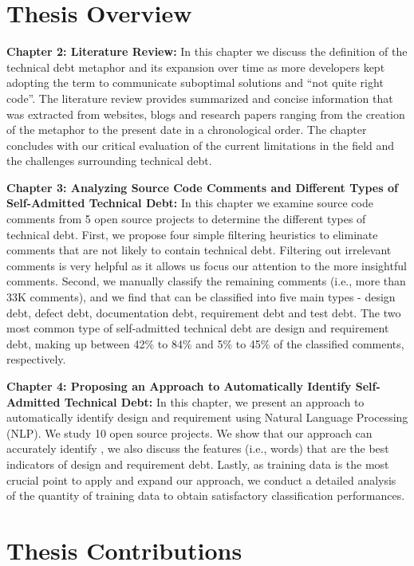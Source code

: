 \section{Thesis Overview}


\noindent\textbf{Chapter 2: Literature Review:} In this chapter we discuss the definition of the technical debt metaphor and its expansion over time as more developers kept adopting the term to communicate suboptimal solutions and ``not quite right code''. The literature review provides summarized and concise information that was extracted from websites, blogs and research papers ranging from the creation of the metaphor to the present date in a chronological order. The chapter concludes with our critical evaluation of the current limitations in the field and the challenges surrounding technical debt.

\vspace{1mm}
\noindent\textbf{Chapter 3: Analyzing Source Code Comments and Different Types of Self-Admitted Technical Debt:} In this chapter we examine source code comments from 5 open source projects to determine the different types of technical debt. First, we propose four simple filtering heuristics to eliminate comments that are not likely to contain technical debt. Filtering out irrelevant comments is very helpful as it allows us focus our attention to the more insightful comments. Second, we manually classify the remaining comments (i.e., more than 33K comments), and we find that \SATD can be classified into five main types - design debt, defect debt, documentation debt, requirement debt and test debt. The two most common type of self-admitted technical debt are design and requirement debt, making up between 42\% to 84\% and 5\% to 45\% of the classified comments, respectively.

\vspace{1mm}
\noindent\textbf{Chapter 4: Proposing an Approach to Automatically Identify Self-Admitted Technical Debt:} In this chapter, we present an approach to automatically identify design and requirement \SATD using Natural Language Processing (NLP). We study 10 open source projects. We show that our approach can accurately identify \SATD, we also discuss the features (i.e., words) that are the best indicators of design and requirement debt. Lastly, as training data is the most crucial point to apply and expand our approach, we conduct a detailed analysis of the quantity of training data to obtain satisfactory classification performances.

\section{Thesis Contributions}

